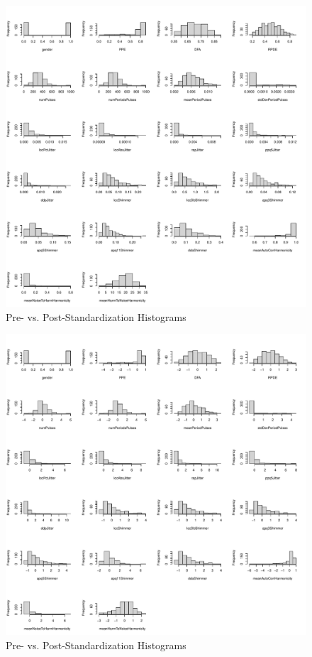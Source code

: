 \documentclass[
]{article}
\begin{document}
\begin{figure}

{\centering \includegraphics[width=1\linewidth,height=1\textheight]{figure/histPlots-1} 

}

\caption{\label{fig:histPlots}Pre- vs. Post-Standardization Histograms}\label{fig:histPlots-1}
\end{figure}
\begin{figure}

{\centering \includegraphics[width=1\linewidth,height=1\textheight]{figure/histPlots-2} 

}

\caption{\label{fig:histPlots}Pre- vs. Post-Standardization Histograms}\label{fig:histPlots-2}
\end{figure}
\end{document}
